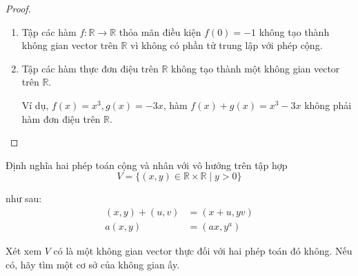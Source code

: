 \begin{proof}
\begin{enumerate}[label*= (\alph*),itemsep=0pt]
              Hệ $(X, X^{2}, \ldots, X^{n})$ độc lập tuyến tính với mọi $n\in\mathbb{N}$
              
              Do đó không gian vector này có số chiều là $\infty$.
        \item Tập các hàm $f: \mathbb{R}\rightarrow\mathbb{R}$ thỏa mãn điều kiện $f(0) = -1$ không tạo thành không gian vector trên $\mathbb{R}$ vì không có phần tử trung lập với phép cộng.
        \item Tập các hàm thực đơn điệu trên $\mathbb{R}$ không tạo thành một không gian vector trên $\mathbb{R}$.
              
              Ví dụ, $f(x) = x^{3}, g(x) = -3x$, hàm $f(x) + g(x) = x^{3} - 3x$ không phải hàm đơn điệu trên $\mathbb{R}$.
    \end{enumerate}
\end{proof}

\begin{exercise}Định nghĩa hai phép toán cộng và nhân với vô hướng trên tập hợp
    \[ V = \{ (x, y)\in\mathbb{R}\times\mathbb{R}\mid y > 0 \} \]
    
    như sau:
    \begin{align*}
        (x, y) + (u, v) & = (x + u, yv) \\
        a(x, y)         & = (ax, y^{a})
    \end{align*}
    
    Xét xem $V$ có là một không gian vector thực đối với hai phép toán đó không. Nếu có, hãy tìm một cơ sở của không gian ấy.
\end{exercise}

